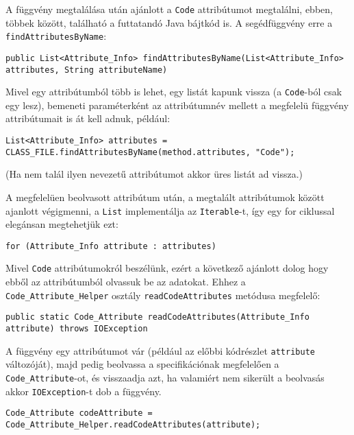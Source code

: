 A függvény megtalálása után ajánlott a \lstinline{Code} attribútumot megtalálni, ebben, többek között, található a futtatandó Java bájtkód is. A segédfüggvény erre a \lstinline{findAttributesByName}:
\begin{verbatim}
public List<Attribute_Info> findAttributesByName(List<Attribute_Info> attributes, String attributeName)
\end{verbatim}
Mivel egy attribútumból több is lehet, egy listát kapunk vissza (a \lstinline{Code}-ból csak egy lesz), bemeneti paraméterként az attribútumnév mellett a megfelelü függvény attribútumait is át kell adnuk, például:
\begin{verbatim}
List<Attribute_Info> attributes = CLASS_FILE.findAttributesByName(method.attributes, "Code");
\end{verbatim}
(Ha nem talál ilyen nevezetű attribútumot akkor üres listát ad vissza.)

A megfelelüen beolvasott attribútum után, a megtalált attribútumok között ajanlott végigmenni, a \lstinline{List} implementálja az \lstinline{Iterable}-t, így egy for ciklussal elegánsan megtehetjük ezt:
\begin{verbatim}
for (Attribute_Info attribute : attributes)
\end{verbatim}

Mivel \lstinline{Code} attribútumokról beszélünk, ezért a következő ajánlott dolog hogy ebből az attribútumból olvassuk be az adatokat. Ehhez a \lstinline{Code_Attribute_Helper} osztály \lstinline{readCodeAttributes} metódusa megfelelő:
\begin{verbatim}
public static Code_Attribute readCodeAttributes(Attribute_Info attribute) throws IOException
\end{verbatim}
A függvény egy attribútumot vár (például az előbbi kódrészlet \lstinline{attribute} változóját), majd pedig beolvassa a specifikációnak megfelelően a \lstinline{Code_Attribute}-ot, és visszaadja azt, ha valamiért nem sikerült a beolvasás akkor \lstinline{IOException}-t dob a függvény.
\begin{verbatim}
Code_Attribute codeAttribute = Code_Attribute_Helper.readCodeAttributes(attribute);
\end{verbatim}

